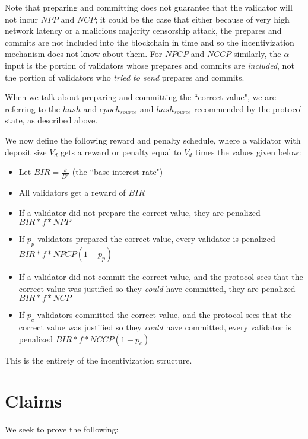 \documentclass[12pt]{article}
\begin{document}
Note that preparing and committing does not guarantee that the validator will not incur $NPP$ and $NCP$; it could be the case that either because of very high network latency or a malicious majority censorship attack, the prepares and commits are not included into the blockchain in time and so the incentivization mechanism does not know about them. For $NPCP$ and $NCCP$ similarly, the $\alpha$ input is the portion of validators whose prepares and commits are \textit{included}, not the portion of validators who \textit{tried to send} prepares and commits. 

When we talk about preparing and committing the ``correct value", we are referring to the $hash$ and $epoch_{source}$ and $hash_{source}$ recommended by the protocol state, as described above.

We now define the following reward and penalty schedule, where a validator with deposit size $V_d$ gets a reward or penalty equal to $V_d$ times the values given below:

\begin{itemize}
\item Let $BIR = \frac{k}{D^p}$ (the ``base interest rate")
\item All validators get a reward of $BIR$
\item If a validator did not prepare the correct value, they are penalized $BIR * f * NPP$
\item If $p_p$ validators prepared the correct value, every validator is penalized $BIR * f * NPCP(1 - p_p)$
\item If a validator did not commit the correct value, and the protocol sees that the correct value was justified so they \textit{could} have committed, they are penalized $BIR * f * NCP$
\item If $p_c$ validators committed the correct value, and the protocol sees that the correct value was justified so they \textit{could} have committed, every validator is penalized $BIR * f * NCCP(1 - p_c)$
\end{itemize}

This is the entirety of the incentivization structure.

\section{Claims}

We seek to prove the following:
\end{document}
